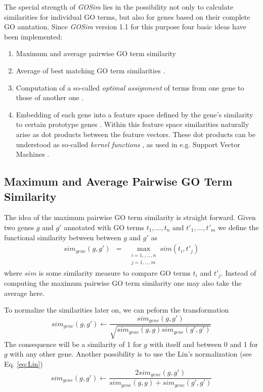 \documentclass[12pt,a4paper]{article}
\begin{document}
The special strength of \emph{GOSim} lies in the possibility not only to calculate similarities for individual GO terms, but also for genes based on their complete GO anntation. Since \emph{GOSim} version 1.1 for this purpose four basic ideas have been implemented: 
\begin{enumerate}
\item Maximum and average pairwise GO term similarity
\item Average of best matching GO term similarities \cite{Schlicker2006GOFuncSim}.
\item Computation of a so-called \emph{optimal assignment} of terms from one gene to those of another one \cite{FroeSpeerGOKer06}.
\item Embedding of each gene into a feature space defined by the gene's similarity to certain prototype genes  \cite{FroeGO05,FroeSpeerGOKer06}. Within this feature space similarities naturally arise as dot products between the feature vectors. These dot products can be understood as so-called \emph{kernel functions} \cite{SchSmo02}, as used in e.g. Support Vector Machines \cite{CorVap95}.
\end{enumerate}

\subsection{Maximum and Average Pairwise GO Term Similarity}

The idea of the maximum pairwise GO term similarity is straight forward. Given two genes $g$ and $g'$ annotated with GO terms $t_{1},...,t_{n}$ and $t'_{1},...,t'_{m}$ we define the functional similarity between between $g$ and $g'$ as
\begin{eqnarray}
sim_{gene}(g,g') & = & \max_{\begin{array}{c}
i=1,,...,n\\
j=1,...,m\end{array}}sim(t_{i},t'_{j})
\end{eqnarray}
where $sim$ is some similarity measure to compare GO terms $t_i$ and $t'_j$.
Instead of computing the maximum pairwise GO term similarity one may also take the average here.

To normalize the similarities later on, we can peform the transformation
\begin{equation}
sim_{gene}(g,g')\leftarrow\frac{sim_{gene}(g,g')}{\sqrt{sim_{gene}(g,g)sim_{gene}(g',g')}}\label{eq:normalize}
\end{equation}
The consequence will be a similarity of 1 for $g$ with itself and between 0 and 1 for $g$ with any other gene. 
Another possibility is to use the Lin's normalization (see Eq. \ref{eq:Lin})
\begin{equation}
sim_{gene}(g,g')\leftarrow\frac{2sim_{gene}(g,g')}{sim_{gene}(g,g)+sim_{gene}(g',g')}\label{eq:normalize2}
\end{equation}
\end{document}
